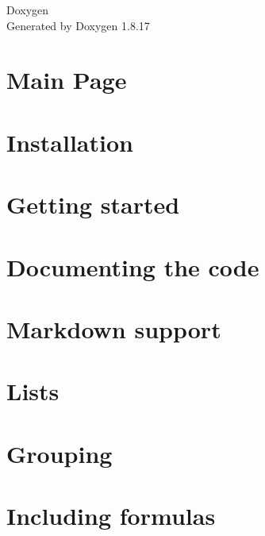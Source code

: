 \let\mypdfximage\pdfximage\def\pdfximage{\immediate\mypdfximage}\documentclass[twoside]{book}
\newcommand{\+}{\discretionary{\mbox{\scriptsize$\hookleftarrow$}}{}{}}
\newcommand{\clearemptydoublepage}{%
  \newpage{\pagestyle{empty}\cleardoublepage}%
}
\begin{document}
\hypersetup{pageanchor=false,
             bookmarksnumbered=true,
             pdfencoding=unicode
            }
\begin{titlepage}
\vspace*{7cm}
\begin{center}%
{\Large Doxygen }\\
\vspace*{1cm}
{\large Generated by Doxygen 1.8.17}\\
\end{center}
\end{titlepage}
\clearemptydoublepage
{}
\tableofcontents
\clearemptydoublepage
{}
\hypersetup{pageanchor=true}

\chapter{Main Page}
\label{index}\hypertarget{index}{}
\chapter{Installation}
\label{install}

\chapter{Getting started}
\label{starting}

\chapter{Documenting the code}
\label{docblocks}

\chapter{Markdown support}
\label{markdown}

\chapter{Lists}
\label{lists}

\chapter{Grouping}
\label{grouping}

\chapter{Including formulas}
\label{formulas}

\end{document}
